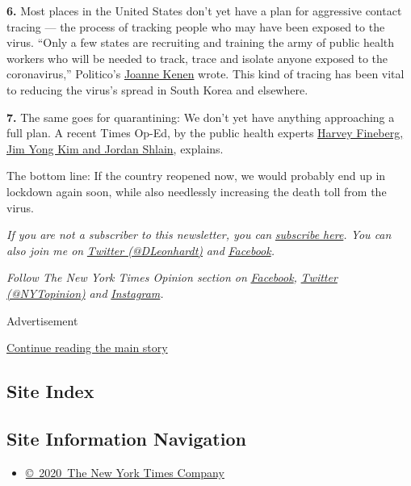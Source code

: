\textbf{6.} Most places in the United States don't yet have a plan for
aggressive contact tracing --- the process of tracking people who may
have been exposed to the virus. ``Only a few states are recruiting and
training the army of public health workers who will be needed to track,
trace and isolate anyone exposed to the coronavirus,'' Politico's
\href{https://www.politico.com/news/2020/04/18/trump-reopen-country-coronavirus-193182}{Joanne
Kenen} wrote. This kind of tracing has been vital to reducing the
virus's spread in South Korea and elsewhere.

\textbf{7.} The same goes for quarantining: We don't yet have anything
approaching a full plan. A recent Times Op-Ed, by the public health
experts
\href{https://www.nytimes.com/2020/04/07/opinion/coronavirus-smart-quarantine.html}{Harvey
Fineberg, Jim Yong Kim and Jordan Shlain}, explains.

The bottom line: If the country reopened now, we would probably end up
in lockdown again soon, while also needlessly increasing the death toll
from the virus.

\emph{If you are not a subscriber to this newsletter, you can}
\href{https://www.nytimes.com/newsletters/david-leonhardt}{\emph{subscribe
here}}\emph{. You can also join me on}
\href{https://twitter.com/DLeonhardt}{\emph{Twitter (@DLeonhardt)}}
\emph{and}
\href{https://www.facebook.com/DavidRLeonhardt/}{\emph{Facebook}}\emph{.}

\emph{Follow The New York Times Opinion section on}
\href{https://www.facebook.com/nytopinion}{\emph{Facebook}}\emph{,}
\href{http://twitter.com/NYTOpinion}{\emph{Twitter (@NYTopinion)}}
\emph{and}
\href{https://www.instagram.com/nytopinion/}{\emph{Instagram}}\emph{.}

Advertisement

\protect\hyperlink{after-bottom}{Continue reading the main story}

\hypertarget{site-index}{%
\subsection{Site Index}\label{site-index}}

\hypertarget{site-information-navigation}{%
\subsection{Site Information
Navigation}\label{site-information-navigation}}

\begin{itemize}
\tightlist
\item
  \href{https://help.nytimes.com/hc/en-us/articles/115014792127-Copyright-notice}{©~2020~The
  New York Times Company}
\end{itemize}

